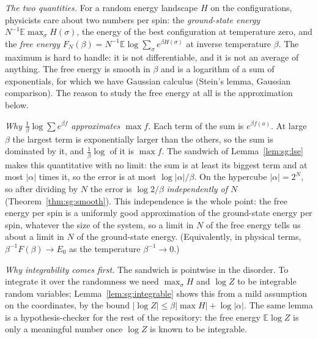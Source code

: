 \begin{remark}\label{rem:sg:free-intuition}
\emph{The two quantities.} For a random energy landscape $H$ on the configurations, physicists care about two numbers per spin: the \emph{ground-state energy} $N^{-1}\mathbb E\max_\sigma H(\sigma)$, the energy of the best configuration at
temperature zero, and the \emph{free energy} $F_N(\beta)=N^{-1}\mathbb E\log\sum_\sigma e^{\beta H(\sigma)}$ at inverse temperature $\beta$. The maximum is hard to handle: it is not differentiable, and it is not an average of anything.
The free energy is smooth in $\beta$ and is a logarithm of a sum of exponentials, for which we have Gaussian calculus (Stein's lemma, Gaussian comparison). The reason to study the free energy at all is the approximation below.

\emph{Why $\frac1\beta\log\sum e^{\beta f}$ approximates $\max f$.} Each term of the sum is $e^{\beta f(a)}$. At large $\beta$ the largest term is exponentially larger than the others, so the sum is dominated by it, and $\frac1\beta\log$ of it is $\max f$.
The sandwich of Lemma~\ref{lem:sg:lse} makes this quantitative with no limit: the sum is at least its biggest term and at most $|\alpha|$ times it, so the error is at most $\log|\alpha|/\beta$. On the hypercube $|\alpha|=2^N$, so after dividing by $N$ the error is $\log2/\beta$
\emph{independently of $N$} (Theorem~\ref{thm:sg:smooth}). This independence is the whole point: the free energy per spin is a uniformly good approximation of the ground-state energy per spin, whatever the size of the system, so a limit in $N$ of the free energy tells us about
a limit in $N$ of the ground-state energy. (Equivalently, in physical terms, $\beta^{-1}F(\beta)\to E_0$ as the temperature $\beta^{-1}\to0$.)

\emph{Why integrability comes first.} The sandwich is pointwise in the disorder. To integrate it over the randomness we need $\max_\sigma H$ and $\log Z$ to be integrable random variables; Lemma~\ref{lem:sg:integrable} shows this from a mild assumption on the coordinates,
by the bound $|\log Z|\le\beta|\max H|+\log|\alpha|$. The same lemma is a hypothesis-checker for the rest of the repository: the free energy $\mathbb E\log Z$ is only a meaningful number once $\log Z$ is known to be integrable.


\end{remark}
